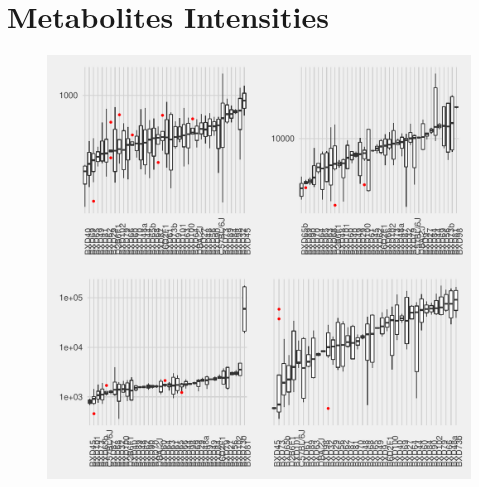 \documentclass[a4paper]{book}
\begin{document}
\begin{subappendices}
\begin{figure}[bht!]
\end{figure}

\clearpage

\section{Metabolites Intensities}
\begin{figure}[ht!b]
	\centering
	\includegraphics[width=\linewidth]{Appendix_FIgures/4_Single_metab_plots.pdf}
\end{figure}

\clearpage


\end{subappendices}
\end{document}

